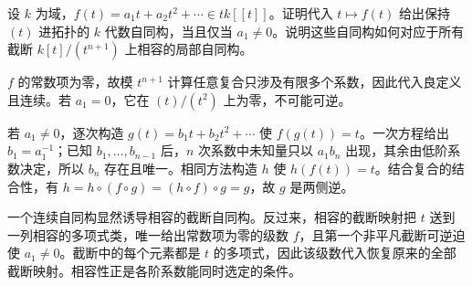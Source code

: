\begin{exercise}\label{g5:ex:formal-one-variable-automorphism}
	设 \(k\) 为域，\(f(t)=a_1t+a_2t^2+\cdots\in t k[[t]]\)。证明代入 \(t\mapsto f(t)\) 给出保持 \((t)\) 进拓扑的 \(k\) 代数自同构，当且仅当 \(a_1\ne0\)。说明这些自同构如何对应于所有截断 \(k[t]/(t^{n+1})\) 上相容的局部自同构。
\end{exercise}
\begin{solution}
	\(f\) 的常数项为零，故模 \(t^{n+1}\) 计算任意复合只涉及有限多个系数，因此代入良定义且连续。若 \(a_1=0\)，它在 \((t)/(t^2)\) 上为零，不可能可逆。

	若 \(a_1\ne0\)，逐次构造 \(g(t)=b_1t+b_2t^2+\cdots\) 使 \(f(g(t))=t\)。一次方程给出 \(b_1=a_1^{-1}\)；已知 \(b_1,\ldots,b_{n-1}\) 后，\(n\) 次系数中未知量只以 \(a_1b_n\) 出现，其余由低阶系数决定，所以 \(b_n\) 存在且唯一。相同方法构造 \(h\) 使 \(h(f(t))=t\)。结合复合的结合性，有
	\(h=h\circ(f\circ g)=(h\circ f)\circ g=g\)，故 \(g\) 是两侧逆。

	一个连续自同构显然诱导相容的截断自同构。反过来，相容的截断映射把 \(t\) 送到一列相容的多项式类，唯一给出常数项为零的级数 \(f\)，且第一个非平凡截断可逆迫使 \(a_1\ne0\)。截断中的每个元素都是 \(t\) 的多项式，因此该级数代入恢复原来的全部截断映射。相容性正是各阶系数能同时选定的条件。
\end{solution}

